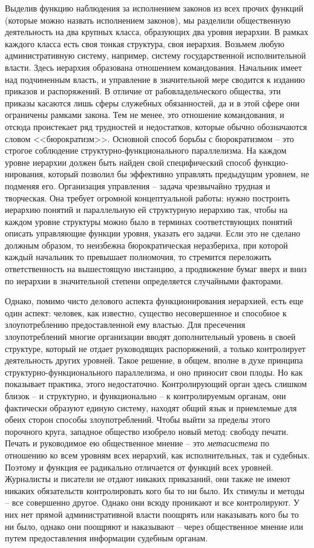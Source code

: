 \documentclass{book}
\begin{document}
Выделив функцию наблюдения за исполнением законов из всех прочих функций (которые можно назвать исполнением законов), мы разделили общественную деятельность на два крупных класса, образующих два уровня иерархии. В рамках каждого класса есть своя тонкая структура, своя иерархия. Возьмем любую административную систему, например, си­стему государственной исполнительной власти. Здесь иерархия образована отношением командования. Начальник имеет над подчиненным власть, и управление в значительной мере сво­дится к изданию приказов и распоряжений. В отличие от рабо­владельческого общества, эти приказы касаются лишь сферы служебных обязанностей, да и в этой сфере они ограничены рамками закона. Тем не менее, это отношение командования, и отсюда проистекает ряд трудностей и недостатков, которые обычно обозначаются словом <<бюрократизм>>. Основной способ борьбы с бюрократизмом -- это строгое соблюдение структур­но-функционального параллелизма. На каждом уровне иерар­хии должен быть найден свой специфический способ 
функцио­нирования, который позволил бы эффективно управлять преды­дущим уровнем, не подменяя его. Организация управления -- задача чрезвычайно трудная и творческая. Она требует огром­ной концептуальной работы: нужно построить иерархию поня­тий и параллельную ей структурную иерархию так, чтобы на каждом уровне структуры можно было в терминах соответствующих понятий описать управляющие функции уровня, ука­зать его задачи. Если это не сделано должным образом, то неиз­бежна бюрократическая неразбериха, при которой каждый на­чальник то превышает полномочия, то стремится переложить ответственность на вышестоящую инстанцию, а продвижение бумаг вверх и вниз по иерархии в значительной степени опре­деляется случайными факторами.

Однако, помимо чисто делового аспекта функционирования иерархией, есть еще один аспект: человек, как известно, сущест­во несовершенное и способное к злоупотреблению предостав­ленной ему властью. Для пресечения злоупотреблений многие организации вводят дополнительный уровень в своей структу­ре, который не отдает руководящих распоряжений, а только контролирует деятельность других уровней. Такое решение, в общем, вполне в духе принципа структурно-функционально­го параллелизма, и оно приносит свои плоды. Но как показы­вает практика, этого недостаточно. Контролирующий орган здесь слишком близок -- и структурно, и функционально -- к контролируемым органам, они фактически образуют единую систему, находят общий язык и приемлемые для обеих сто­рон способы злоупотреблений. Чтобы выйти за пределы этого порочного круга, западное общество изобрело новый метод: свободу печати. Печать и руководимое ею общественное мнение -- это \textit{метасистема}  по отношению ко всем уровням всех иерархий, как исполнительных, так и 
судебных. 
Поэтому и функция ее радикально отличается от функций всех уровней. Журналисты и писатели не отдают никаких приказаний, они также не имеют никаких обязательств контролировать кого бы то ни было. Их стимулы и методы -- все совершенно другое. Однако они всюду проникают и все контролируют. У них нет прямой административной власти поощрять или наказывать кого бы то ни было, однако они поощряют и наказывают -- че­рез общественное мнение или путем предоставления информа­ции судебным органам.
\end{document}

